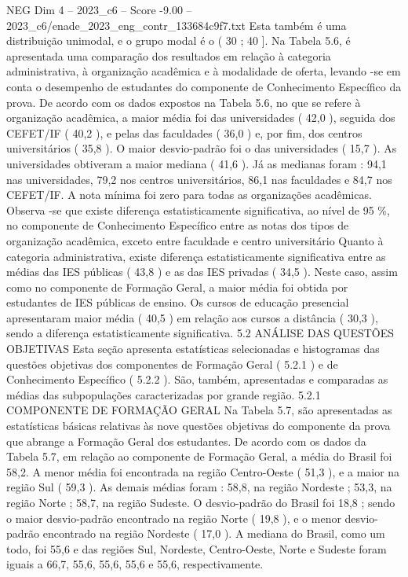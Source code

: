 \begin{textsample}{NEG Dim 4 – 2023\_c6 – Score -9.00 – 2023\_c6/enade\_2023\_eng\_contr\_133684c9f7.txt}
Esta também é uma distribuição unimodal, e o grupo modal é o ( 30 ; 40 ].
Na Tabela 5.6, é apresentada uma comparação dos resultados em relação à categoria administrativa, à organização acadêmica e à modalidade de oferta, levando -se em conta o desempenho de estudantes do componente de Conhecimento Específico da prova.
De acordo com os dados expostos na Tabela 5.6, no que se refere à organização acadêmica, a maior média foi das universidades ( 42,0 ), seguida dos CEFET/IF ( 40,2 ), e pelas das faculdades ( 36,0 ) e, por fim, dos centros universitários ( 35,8 ).
O maior desvio-padrão foi o das universidades ( 15,7 ).
As universidades obtiveram a maior mediana ( 41,6 ).
Já as medianas foram : 94,1 nas universidades, 79,2 nos centros universitários, 86,1 nas faculdades e 84,7 nos CEFET/IF.
A nota mínima foi zero para todas as organizações acadêmicas.
Observa -se que existe diferença estatisticamente significativa, ao nível de 95 \%, no componente de Conhecimento Específico entre as notas dos tipos de organização acadêmica, exceto entre faculdade e centro universitário Quanto à categoria administrativa, existe diferença estatisticamente significativa entre as médias das IES públicas ( 43,8 ) e as das IES privadas ( 34,5 ).
Neste caso, assim como no componente de Formação Geral, a maior média foi obtida por estudantes de IES públicas de ensino.
Os cursos de educação presencial apresentaram maior média ( 40,5 ) em relação aos cursos a distância ( 30,3 ), sendo a diferença estatisticamente significativa. 5.2 ANÁLISE DAS QUESTÕES OBJETIVAS Esta seção apresenta estatísticas selecionadas e histogramas das questões objetivas dos componentes de Formação Geral ( 5.2.1 ) e de Conhecimento Específico ( 5.2.2 ).
São, também, apresentadas e comparadas as médias das subpopulações caracterizadas por grande região. 5.2.1 COMPONENTE DE FORMAÇÃO GERAL Na Tabela 5.7, são apresentadas as estatísticas básicas relativas às nove questões objetivas do componente da prova que abrange a Formação Geral dos estudantes.
De acordo com os dados da Tabela 5.7, em relação ao componente de Formação Geral, a média do Brasil foi 58,2.
A menor média foi encontrada na região Centro-Oeste ( 51,3 ), e a maior na região Sul ( 59,3 ).
As demais médias foram : 58,8, na região Nordeste ; 53,3, na região Norte ; 58,7, na região Sudeste.
O desvio-padrão do Brasil foi 18,8 ; sendo o maior desvio-padrão encontrado na região Norte ( 19,8 ), e o menor desvio-padrão encontrado na região Nordeste ( 17,0 ).
A mediana do Brasil, como um todo, foi 55,6 e das regiões Sul, Nordeste, Centro-Oeste, Norte e Sudeste foram iguais a 66,7, 55,6, 55,6, 55,6 e 55,6, respectivamente.

\end{textsample}
